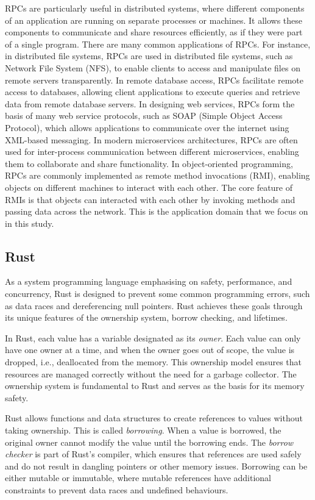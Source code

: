 RPCs are particularly useful in distributed systems, where different components of an application are running on separate processes or machines. It allows these components to communicate and share resources efficiently, as if they were part of a single program. There are many common applications of RPCs. For instance, in distributed file systems, RPCs are used in distributed file systems, such as Network File System (NFS), to enable clients to access and manipulate files on remote servers transparently. In remote database access, RPCs facilitate remote access to databases, allowing client applications to execute queries and retrieve data from remote database servers. In designing web services, RPCs form the basis of many web service protocols, such as SOAP (Simple Object Access Protocol), which allows applications to communicate over the internet using XML-based messaging. In modern microservices architectures, RPCs are often used for inter-process communication between different microservices, enabling them to collaborate and share functionality. In object-oriented programming, RPCs are commonly implemented as remote method invocations (RMI), enabling objects on different machines to interact with each other. The core feature of RMIs is that objects can interacted with each other by invoking methods and passing data across the network. This is the application domain that we focus on in this study.

\subsection{Rust}
\label{chap3:background:rust}
As a system programming language emphasising on safety, performance, and concurrency, Rust is designed to prevent some common programming errors, such as data races and dereferencing null pointers. Rust achieves these goals through its unique features of the ownership system, borrow checking, and lifetimes.

In Rust, each value has a variable designated as its \emph{owner}. Each value can only have one owner at a time, and when the owner goes out of scope, the value is dropped, i.e., deallocated from the memory. This ownership model ensures that resources are managed correctly without the need for a garbage collector. The ownership system is fundamental to Rust and serves as the basis for its memory safety.

Rust allows functions and data structures to create references to values without taking ownership. This is called \emph{borrowing}. When a value is borrowed, the original owner cannot modify the value until the borrowing ends. The \emph{borrow checker} is part of Rust's compiler, which ensures that references are used safely and do not result in dangling pointers or other memory issues. Borrowing can be either mutable or immutable, where mutable references have additional constraints to prevent data races and undefined behaviours.

